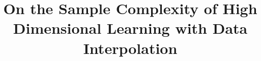 \documentclass[conference,a4paper]{IEEEtran}
\begin{document}
\title{On the Sample Complexity of High Dimensional Learning with Data Interpolation}

\author{%
}

%
%
%
%
\end{document}
